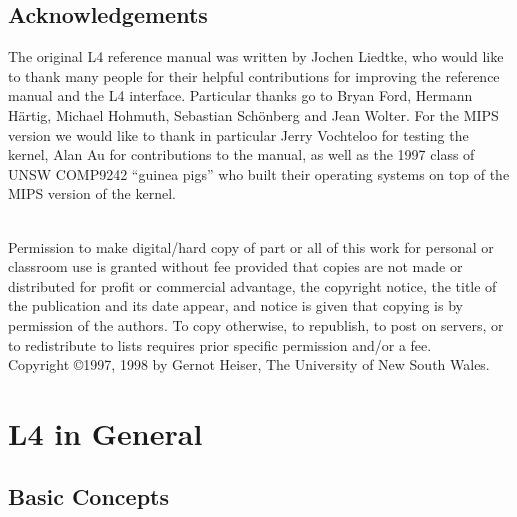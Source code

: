 \documentclass[a4paper,11pt,twoside,dvips]{book}
\begin{document}
\section*{Acknowledgements} 
The original L4 reference manual was written by Jochen Liedtke, who
would like to thank many people for their helpful contributions for
improving the reference manual and the L4 interface. Particular thanks
go to Bryan Ford, Hermann H\"{a}rtig, Michael Hohmuth, Sebastian
Sch\"{o}nberg and Jean Wolter. For the MIPS version we would like to
thank in particular Jerry Vochteloo for testing the kernel, Alan Au for
contributions to the manual, as well as the 1997 class of UNSW COMP9242
``guinea pigs'' who built their operating systems on top of the MIPS
version of the kernel.
 
 
\vspace*{\fill} 
{\small
\noindent\hrulefill\\
%
Permission to make digital/hard copy of part or all of this work for
personal or classroom use is granted without fee provided that copies
are not made or distributed for profit or commercial advantage, the
copyright notice, the title of the publication and its date appear, and
notice is given that copying is by permission of the authors. To copy
otherwise, to republish, to post on servers, or to redistribute to lists
requires prior specific permission and/or a fee.\\[2ex]
%
Copyright \copyright 1997, 1998 by Gernot Heiser, The University of New South Wales.
}
 
\clearpage 
 
\thispagestyle{headings} 
 
\tableofcontents 
 
\thispagestyle{headings} 
 
 
\thispagestyle{headings} 
 
 
\thispagestyle{headings} 
 
\cleardoublepage 
 
 
 
 
 
 
\chapter{L4 in General} 
 
 
\section{Basic Concepts}              \label{concepts} 
 
\end{document}
